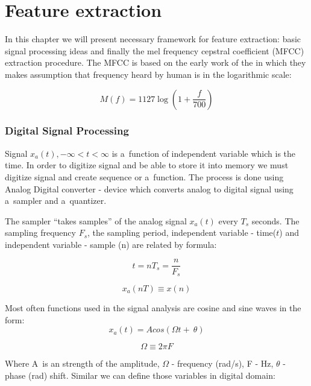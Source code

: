 \chapter{Feature extraction}

In this chapter we will present necessary framework for feature extraction: basic signal processing ideas and finally the mel frequency cepstral coefficient (MFCC) extraction procedure. The MFCC is based on the early work of the \textcite{stevens_scale_1937} in which they makes assumption that frequency heard by human is in the logarithmic scale:

\begin{equation}
	\label{eq:mel}
	M(f) = 1127\log\left(1+\frac{f}{700}\right)
\end{equation}

\subsection{Digital Signal Processing}

Signal $x_a(t), -\infty < t < \infty$ is a~function of independent variable which is the time. In order to digitize signal and be able to store it into memory we must digitize signal and create sequence or a~function. The process is done using Analog Digital converter - device which converts analog to digital signal using a~sampler and a~quantizer.

The sampler ``takes samples'' of the analog signal $x_a(t)$ every $T_s$ seconds. The sampling frequency $F_s$, the sampling period, independent variable - time($t$) and independent variable - sample (n) are related by formula:

\begin{equation}
	t = nT_s = \frac{n}{F_s}
\end{equation}

\begin{equation}
	x_a(nT) \equiv x(n)
\end{equation}


Most often functions used in the signal analysis are cosine and sine waves in the form:
\begin{equation}
	x_a(t) = Acos(\Omega t +~\theta)
\end{equation}

\begin{equation}
	\Omega \equiv 2\pi F
\end{equation}

Where A~is an strength of the amplitude, $\Omega$ - frequency (rad/s), F - Hz, $\theta$ - phase (rad) shift.  
Similar we can define those variables in digital domain:

